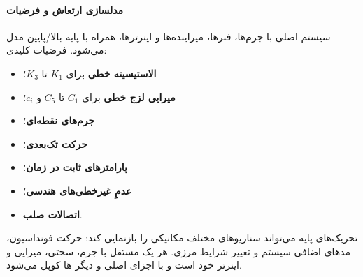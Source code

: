 \paragraph{مدلسازی ارتعاش و فرضیات}
سیستم اصلی با جرم‌ها، فنرها، میراینده‌ها و اینرترها، همراه با پایه بالا/پایین مدل می‌شود. فرضیات کلیدی:
\begin{itemize}
    \item \textbf{الاستیسیته خطی} برای $K_1$ تا $K_3$؛
    \item \textbf{میرایی لزج خطی} برای $C_1$ تا $C_5$ و $c_i$؛
    \item \textbf{جرم‌های نقطه‌ای}؛
    \item \textbf{حرکت تک‌بعدی}؛
    \item \textbf{پارامترهای ثابت در زمان}؛
    \item \textbf{عدمِ غیرخطی‌های هندسی}؛
    \item \textbf{اتصالات صلب}.
\end{itemize}
تحریک‌های پایه می‌تواند سناریوهای مختلف مکانیکی را بازنمایی کند: حرکت فونداسیون، مدهای اضافی سیستم و تغییر شرایط مرزی. هر  یک  مستقل با جرم، سختی، میرایی و اینرتر خود است و با اجزای اصلی و دیگر ‌ها کوپل می‌شود.

